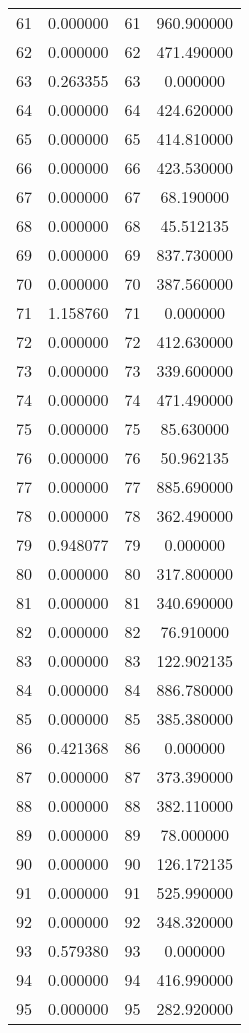 \documentclass[12pt]{article}
\begin{document}
\begin{longtable}{@{}cccc@{}}
61 & 0.000000 & 61 & 960.900000 \\
62 & 0.000000 & 62 & 471.490000 \\
63 & 0.263355 & 63 & 0.000000 \\
64 & 0.000000 & 64 & 424.620000 \\
65 & 0.000000 & 65 & 414.810000 \\
66 & 0.000000 & 66 & 423.530000 \\
67 & 0.000000 & 67 & 68.190000 \\
68 & 0.000000 & 68 & 45.512135 \\
69 & 0.000000 & 69 & 837.730000 \\
70 & 0.000000 & 70 & 387.560000 \\
71 & 1.158760 & 71 & 0.000000 \\
72 & 0.000000 & 72 & 412.630000 \\
73 & 0.000000 & 73 & 339.600000 \\
74 & 0.000000 & 74 & 471.490000 \\
75 & 0.000000 & 75 & 85.630000 \\
76 & 0.000000 & 76 & 50.962135 \\
77 & 0.000000 & 77 & 885.690000 \\
78 & 0.000000 & 78 & 362.490000 \\
79 & 0.948077 & 79 & 0.000000 \\
80 & 0.000000 & 80 & 317.800000 \\
81 & 0.000000 & 81 & 340.690000 \\
82 & 0.000000 & 82 & 76.910000 \\
83 & 0.000000 & 83 & 122.902135 \\
84 & 0.000000 & 84 & 886.780000 \\
85 & 0.000000 & 85 & 385.380000 \\
86 & 0.421368 & 86 & 0.000000 \\
87 & 0.000000 & 87 & 373.390000 \\
88 & 0.000000 & 88 & 382.110000 \\
89 & 0.000000 & 89 & 78.000000 \\
90 & 0.000000 & 90 & 126.172135 \\
91 & 0.000000 & 91 & 525.990000 \\
92 & 0.000000 & 92 & 348.320000 \\
93 & 0.579380 & 93 & 0.000000 \\
94 & 0.000000 & 94 & 416.990000 \\
95 & 0.000000 & 95 & 282.920000 \\

\end{longtable}
\end{document}
